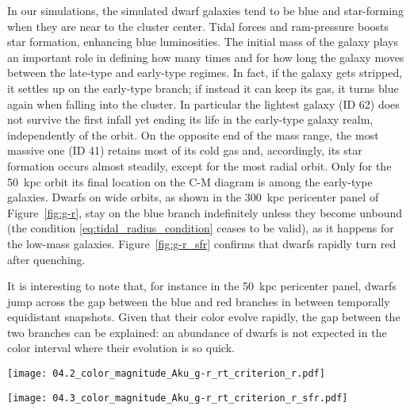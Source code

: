 In our simulations, the simulated dwarf galaxies tend to be blue and star-forming when they are near to the cluster center.
Tidal forces and ram-pressure boosts star formation, enhancing blue luminosities.
The initial mass of the galaxy plays an important role in defining how many times and for how long the galaxy moves between the late-type and early-type regimes.
In fact, if the galaxy gets stripped, it settles up on the early-type branch; if instead it can keep its gas, it turns blue again when falling into the cluster.
In particular the lightest galaxy (ID 62) does not survive the first infall yet ending its life in the early-type galaxy realm, independently of the orbit.
On the opposite end of the mass range, the most massive one (ID 41) retains most of its cold gas and, accordingly, its star formation occurs almost steadily, except for the most radial orbit.
Only for the 50~kpc orbit its final location on the C-M diagram is among the early-type galaxies.
Dwarfs on wide orbits, as shown in the 300~kpc pericenter panel of Figure~\ref{fig:g-r}, stay on the blue branch indefinitely unless they become unbound (the condition \eqref{eq:tidal_radius_condition} ceases to be valid), as it happens for the low-mass galaxies.
Figure~\ref{fig:g-r_sfr} confirms that dwarfs rapidly turn red after quenching.

It is interesting to note that, for instance in the 50~kpc pericenter panel, dwarfs jump across the gap between the blue and red branches in between temporally equidistant snapshots.
Given that their color evolve rapidly, the gap between the two branches can be explained: an abundance of dwarfs is not expected in the color interval where their evolution is so quick.


\begin{sidewaysfigure}
\centering
\texttt{[image: 04.2\_color\_magnitude\_Aku\_g-r\_rt\_criterion\_r.pdf]}
\caption{SDSS bands colour magnitude diagram of galaxies on different orbits compared to Fornax dwarf catalogue of \citet{Venhola2019}.
Red and blue colour for the data points in the background represent dwarf elliptical (dE) and late type galaxy respectively, classified by eye on the base of morphology.
Empty squares are nucleated dE.
Data tracks of simulated galaxies are shown overlaid colour coded by the clustercentric radius.
The tracks are limited to bound galaxies i.e. they are drawn with snapshots for which condition \eqref{eq:tidal_radius_condition} holds.
}
\label{fig:g-r}
\end{sidewaysfigure}
\begin{sidewaysfigure}
\centering
\texttt{[image: 04.3\_color\_magnitude\_Aku\_g-r\_rt\_criterion\_r\_sfr.pdf]}
\caption{Same as Figure~\ref{fig:g-r}, with point color coded with the specific star formation rate.
Black points are snapshots with no star formation.
}
\label{fig:g-r_sfr}
\end{sidewaysfigure}


